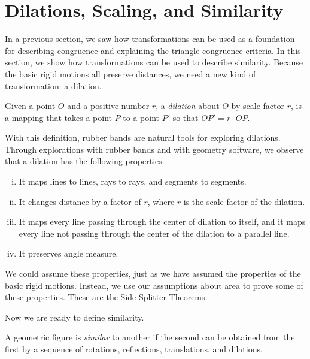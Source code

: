 \section{Dilations, Scaling, and Similarity}
In a previous section, we saw how transformations can be used as a foundation for describing congruence and explaining the triangle congruence criteria.  In this section, we show how transformations can be used to describe similarity.  Because the basic rigid motions all preserve distances, we need a new kind of transformation:  a dilation. 

\begin{definition}
Given a point $O$ and a positive number $r$, a \emph{dilation} about $O$ by scale factor $r$, is a mapping that takes a point $P$ to a point $P'$ so that $OP' = r\cdot OP$.  
\end{definition}

With this definition, rubber bands are natural tools for exploring dilations.  
Through explorations with rubber bands and with geometry software, we observe that a dilation has the following properties:%

\begin{enumerate}[(i)]\parskip0pt
\item It maps lines to lines, rays to rays, and segments to segments.
\item It changes distance by a factor of $r$, where $r$ is the scale factor of the dilation.
\item It maps every line passing through the center of dilation to itself, and it maps every line not passing through the center of the dilation to a parallel line.  
\item It preserves angle measure.
\end{enumerate}

We could assume these properties, just as we have assumed the properties of the basic rigid motions.  Instead, we use our assumptions about area to prove some of these properties.  These are the Side-Splitter Theorems.

Now we are ready to define similarity.  

\begin{definition}
A geometric figure is \emph{similar} to another if the second can be obtained from the first by a sequence of rotations, reflections, translations, and dilations.  
\end{definition}

